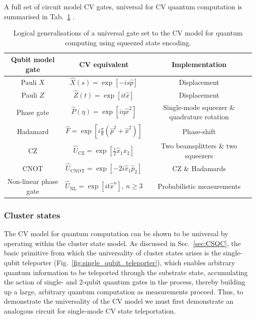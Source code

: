 A full set of circuit model CV gates, universal for CV quantum computation is summarised in Tab.~\ref{tab:CV_gates} \cite{bib:RevModPhys.84.621}.

\startnormtable
\begin{table}[!htbp]
\begin{tabular}{ |c|c|c| } 
 \hline
 Qubit model gate &  CV equivalent & Implementation \\ 
  \hline\hline
 Pauli $X$ & $\hat{X}(s) = \exp[-i s \hat p]$ & Displacement \\ 
 Pauli $Z$ & $\hat{Z}(t) = \exp[i t \hat x]$ & Displacement \\ 
 Phase gate & $\hat{P}(\eta) = \exp[i \eta \hat x^2]$ & Single-mode squeezer \& quadrature rotation \\
Hadamard   & $\hat{F}=\exp[i \frac{\pi}{8}(\hat p^2+\hat x^2)]$ & Phase-shift \\
CZ		   & $\hat{U}_\mathrm{CZ}= \exp[\frac{i}{2}\hat x_1 \hat x_2]$ & Two beamsplitters \& two squeezers \\
CNOT 	   & $\hat{U}_\mathrm{CNOT} = \exp[-2i\hat x_1 \hat p_2]$ & CZ \& Hadamards \\
Non-linear phase gate &  $\hat{U}_\mathrm{NL}=\exp[i t\hat{x}^n],\,n\geq 3$       &  Probabilistic measurements \\
\hline
\end{tabular}
\captionspacetab \caption{Logical generalisations of a universal gate set to the CV model for quantum computing using squeezed state encoding.\label{tab:CV_gates}}
\end{table}
\startalgtable

%
%

\subsubsection{Cluster states}

The CV model for quantum computation can be shown to be universal by operating within the cluster state model. As discussed in Sec.~\ref{sec:CSQC}, the basic primitive from which the universality of cluster states arises is the single-qubit teleporter (Fig.~\ref{fig:single_qubit_teleporter}), which enables arbitrary quantum information to be teleported through the substrate state, accumulating the action of single- and 2-qubit quantum gates in the process, thereby building up a large, arbitrary quantum computation as measurements proceed. Thus, to demonstrate the universality of the CV model we must first demonstrate an analogous circuit for single-mode CV state teleportation.

